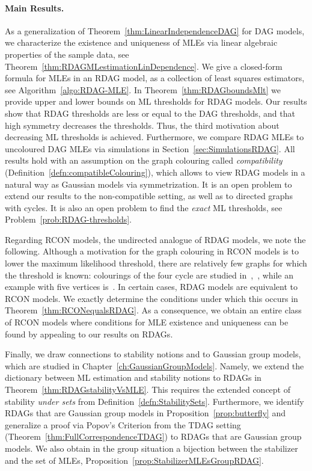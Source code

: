 \paragraph{Main Results.}

As a generalization of Theorem~\ref{thm:LinearIndependenceDAG} for DAG models, we characterize the existence and uniqueness of MLEs via linear algebraic properties of the sample data, see Theorem~\ref{thm:RDAGMLestimationLinDependence}. 
We give a closed-form formula for MLEs in an RDAG model, as a collection of least squares estimators, see Algorithm~\ref{algo:RDAG-MLE}. In Theorem~\ref{thm:RDAGboundsMlt} we provide upper and lower bounds on ML thresholds for RDAG models. Our results show that RDAG thresholds are less or equal to the DAG thresholds, and that high symmetry decreases the thresholds. Thus, the third motivation about decreasing ML thresholds is achieved.
Furthermore, we compare RDAG MLEs to uncoloured DAG MLEs via simulations in Section~\ref{sec:SimulationsRDAG}.
All results hold with an assumption on the graph colouring called {\em compatibility} (Definition~\ref{defn:compatibleColouring}), which allows to view RDAG models in a natural way as Gaussian models via symmetrization. It is an open problem to extend our results to the non-compatible setting, as well as to directed graphs with cycles. It is also an open problem to find the \emph{exact} ML thresholds, see Problem~\ref{prob:RDAG-thresholds}.

Regarding RCON models, the undirected analogue of RDAG models, we note the following.
Although a motivation for the graph colouring in RCON models is to lower the maximum likelihood threshold, there are relatively few graphs for which the threshold is known: colourings of the four cycle are studied in~\cite[\S 6]{uhler2012geometry},~\cite[\S 5]{sturmfels2010multivariate}, while an example with five vertices is~\cite[Example 3.2]{uhler2012geometry}.
In certain cases, RDAG models are equivalent to RCON models. We exactly determine the conditions under which this occurs in Theorem~\ref{thm:RCONequalsRDAG}. As a consequence, we obtain an entire class of RCON models where conditions for MLE existence and uniqueness can be found by appealing to our results on RDAGs.

Finally, we draw connections to stability notions and to Gaussian group models, which are studied in Chapter~\ref{ch:GaussianGroupModels}. Namely, we extend the dictionary between ML estimation and stability notions to RDAGs in Theorem~\ref{thm:RDAGstabilityVsMLE}. This requires the extended concept of stability \emph{under sets} from Definition~\ref{defn:StabilitySets}.
Furthermore, we identify RDAGs that are Gaussian group models in Proposition~\ref{prop:butterfly} and generalize a proof via Popov's Criterion from the TDAG setting (Theorem~\ref{thm:FullCorrespondenceTDAG}) to RDAGs that are Gaussian group models. We also obtain in the group situation a bijection between the stabilizer and the set of MLEs, Proposition~\ref{prop:StabilizerMLEsGroupRDAG}.

